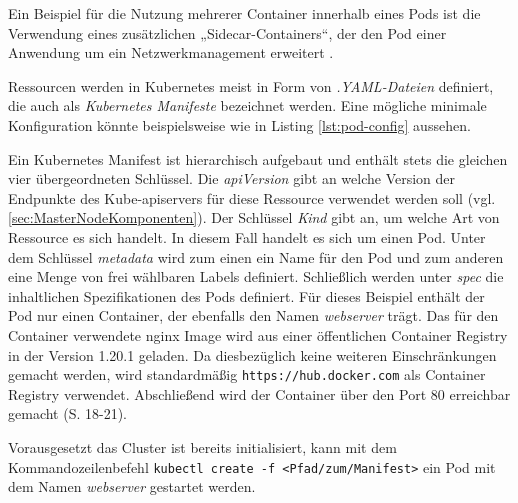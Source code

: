 \documentclass[11pt,a4paper]{article}
\begin{document}
Ein Beispiel für die Nutzung mehrerer Container innerhalb eines Pods ist die Verwendung
eines zusätzlichen „Sidecar-Containers“, der den Pod einer Anwendung um ein Netzwerkmanagement erweitert \cite{9783969109625}.

Ressourcen werden in Kubernetes meist in Form von \emph{.YAML-Dateien} definiert,
die auch als \emph{Kubernetes Manifeste} bezeichnet werden.
Eine mögliche minimale Konfiguration könnte beispielsweise wie in Listing \ref{lst:pod-config} aussehen.

% 
% 
Ein Kubernetes Manifest ist hierarchisch aufgebaut
und enthält stets die gleichen vier übergeordneten Schlüssel.
Die \emph{apiVersion} gibt an welche Version der Endpunkte des Kube-apiservers für diese Ressource
verwendet werden soll (vgl. \ref{sec:MasterNodeKomponenten}).
Der Schlüssel \emph{Kind} gibt an, um welche Art von Ressource es sich handelt.
In diesem Fall handelt es sich um einen Pod.
Unter dem Schlüssel \emph{metadata} wird zum einen ein Name für den Pod
und zum anderen eine Menge von frei wählbaren Labels definiert.
Schließlich werden unter \emph{spec} die inhaltlichen Spezifikationen des Pods
definiert. Für dieses Beispiel enthält der Pod nur einen Container, der ebenfalls den Namen
\emph{webserver} trägt. Das für den Container verwendete nginx Image \cite{nginx} wird aus einer
öffentlichen Container Registry in der Version 1.20.1 geladen. Da diesbezüglich keine weiteren
Einschränkungen gemacht werden, wird standardmäßig \linebreak \lstinline|https://hub.docker.com| als Container Registry
verwendet. Abschließend wird der Container über den Port 80 erreichbar gemacht \cite{Schmeling_Dargatz_2022} (S. 18-21).

Vorausgesetzt das Cluster ist bereits initialisiert, kann mit dem Kommandozeilenbefehl
\lstinline|kubectl create -f <Pfad/zum/Manifest>|
ein Pod mit dem Namen \emph{webserver} gestartet werden.
\end{document}
